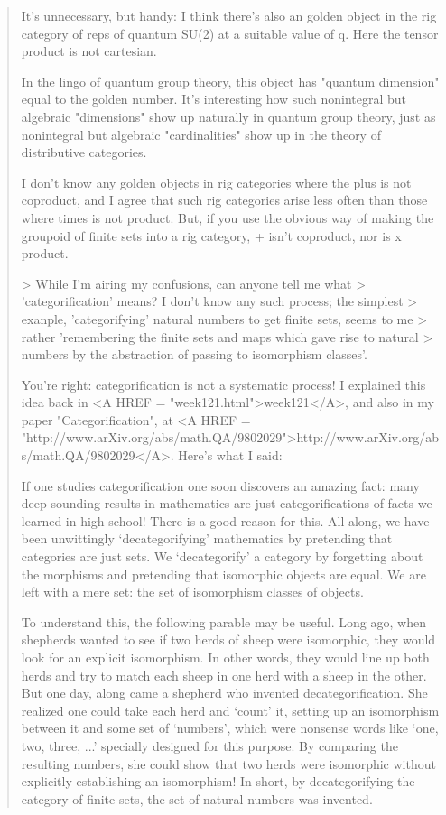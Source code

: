 \begin{quote}
It's unnecessary, but handy: I think there's also an golden object in 
the rig category of reps of quantum SU(2) at a suitable value of q.  
Here the tensor product is not cartesian.  

In the lingo of quantum group theory, this object has "quantum dimension"
equal to the golden number.  It's interesting how such nonintegral but 
algebraic "dimensions" show up naturally in quantum group theory, 
just as nonintegral but algebraic "cardinalities" show up in the theory 
of distributive categories.  

I don't know any golden objects in rig categories where the plus is
not coproduct, and I agree that such rig categories arise less often
than those where times is not product.  But, if you use the obvious 
way of making the groupoid of finite sets into a rig category, + isn't 
coproduct, nor is x product.  

> While I'm airing my confusions, can anyone tell me what
> 'categorification' means? I don't know any such process; the simplest
> exanple, 'categorifying' natural numbers to get finite sets, seems to me
> rather 'remembering the finite sets and maps which gave rise to natural
> numbers by the abstraction of passing to isomorphism classes'.

You're right: categorification is not a systematic process!  
I explained this idea back in <A HREF = "week121.html">week121</A>, and also in my paper
"Categorification", at <A HREF = "http://www.arXiv.org/abs/math.QA/9802029">http://www.arXiv.org/abs/math.QA/9802029</A>.  
Here's what I said:

 If one studies categorification one soon discovers an amazing fact: many
 deep-sounding results in mathematics are just categorifications of facts
 we learned in high school!  There is a good reason for this.  All along,
 we have been unwittingly `decategorifying' mathematics by pretending
 that categories are just sets.  We `decategorify' a category by
 forgetting about the morphisms and pretending that isomorphic objects
 are equal.  We are left with a mere set: the set of isomorphism classes
 of objects. 

 To understand this, the following parable may be useful.  Long ago, when
 shepherds wanted to see if two herds of sheep were isomorphic, they
 would look for an explicit isomorphism.  In other words, they would line
 up both herds and try to match each sheep in one herd with a sheep in
 the other.  But one day, along came a shepherd who invented
 decategorification.  She realized one could take each herd and `count'
 it, setting up an isomorphism between it and some set of `numbers',
 which were nonsense words like `one, two, three, ...' specially
 designed for this purpose.  By comparing the resulting numbers, she
 could show that two herds were isomorphic without explicitly
 establishing an isomorphism!  In short, by decategorifying the category
 of finite sets, the set of natural numbers was invented.   


\end{quote}
